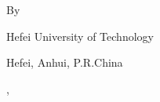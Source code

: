 \begin{titlepage}
\centering
{
\parskip=0pt \linespread{1.25}
\vspace{4.7cm}

\Large \bfseries{\titleEn} \vspace{1.8cm}}

{\sanhao By

\studentNameEn
\vfill
Hefei University of Technology

Hefei, Anhui, P.R.China

\finishedMonth ,\enspace \finishedYear
\vspace{3cm}
}

\end{titlepage}
